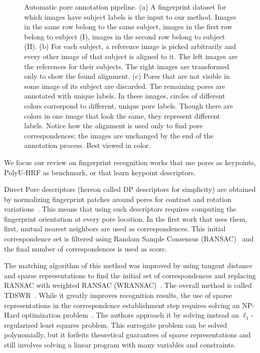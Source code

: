 \documentclass[10pt,twocolumn,letterpaper]{article}
\begin{document}
\begin{figure*}[t]
\begin{center}
\begin{picture}
    \end{picture}
  \end{center}
  \vspace{14pt}
  \caption{Automatic pore annotation pipeline.
  (a) A fingerprint dataset for which images have subject labels is the input to our method.
  Images in the same row belong to the same subject, \ie images in the first row belong to subject (I), images in the second row belong to subject (II).
  (b) For each subject, a reference image is picked arbitrarily and every other image of that subject is aligned to it.
  The left images are the references for their subjects.
  The right images are transformed only to show the found alignment.
  (c) Pores that are not visible in some image of its subject are discarded. The remaining pores are annotated with unique labels.
  In these images, circles of different colors correspond to different, unique pore labels.
  Though there are colors in one image that look the same, they represent different labels.
  Notice how the alignment is used only to find pore correspondences; the images are unchanged by the end of the annotation process.
  Best viewed in color.
  }
  \label{fig:annotation}
\end{figure*}

We focus our review on fingerprint recognition works that use pores as keypoints, PolyU-HRF as benchmark, or that learn keypoint descriptors.

Direct Pore descriptors (hereon called DP descriptors for simplicity) are obtained by normalizing fingerprint patches around pores for contrast and rotation variations~\cite{direct-pore}.
This means that using such descriptors requires computing the fingerprint orientation at every pore location.
In the first work that uses them, first, mutual nearest neighbors are used as correspondences.
This initial correspondence set is filtered using Random Sample Consensus (RANSAC)~\cite{ransac} and the final number of correspondences is used as score.

The matching algorithm of this method was improved by using tangent distance and sparse representations to find the initial set of correspondences and replacing RANSAC with weighted RANSAC (WRANSAC)~\cite{wransac}.
The overall method is called TDSWR~\cite{td-sparse}.
While it greatly improves recognition results, the use of sparse representations in the correspondence establishment step requires solving an NP-Hard optimization problem~\cite{sparse-is-hard}.
The authors approach it by solving instead an $\ell_1$-regularized least squares problem.
This surrogate problem can be solved polynomially, but it forfeits theoretical guarantees of sparse representations and still involves solving a linear program with many variables and constraints.
\end{document}
